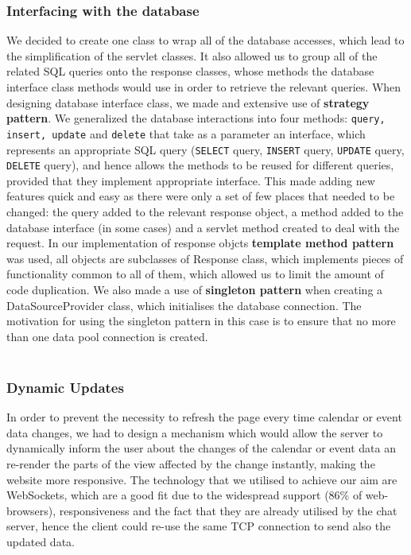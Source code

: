 \documentclass[10pt,a4paper]{article}
\begin{document}
\subsubsection{Interfacing with the database}
\noindent We decided to create one class to wrap all of the database accesses, which lead to the simplification of the servlet classes. It also allowed us to group all of the related SQL queries onto the response classes, whose methods the database interface class methods would use in order to retrieve the relevant queries. When designing database interface class, we made and extensive use of \textbf{strategy pattern}. We generalized the database interactions into four methods: \verb|query, insert, update| and \verb|delete| that take as a parameter an interface, which represents an appropriate SQL query (\verb|SELECT| query, \verb|INSERT| query, \verb|UPDATE| query, \verb|DELETE| query), and hence allows the methods to be reused for different queries, provided that they implement appropriate interface. This made adding new features quick and easy as there were only a set of few places that needed to be changed: the query added to the relevant response object, a method added to the database interface (in some cases) and a servlet method created to deal with the request. In our implementation of response objcts \textbf{template method pattern} was used, all objects are subclasses of Response class, which implements pieces of functionality common to all of them, which allowed us to limit the amount of code duplication. We also made a use of \textbf{singleton pattern} when creating a DataSourceProvider class, which initialises the database connection. The motivation for using the singleton pattern in this case is to ensure that no more than one data pool connection is created. 
\\
\\
\subsubsection{Dynamic Updates}
In order to prevent the necessity to refresh the page every time calendar or event data changes, we had to design a mechanism which would allow the server to dynamically inform the user about the 
changes of the calendar or event data an re-render the parts of the view affected by the change instantly, making the website more responsive. The technology that we utilised to 
achieve our aim are WebSockets, which are a good fit due to the widespread support (86\% of web-browsers), responsiveness and the fact that they are already utilised by the chat server, hence
the client could re-use the same TCP connection to send also the updated data.
\end{document}
